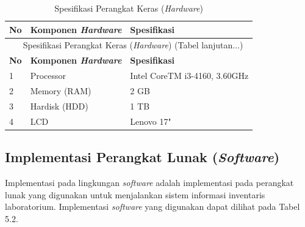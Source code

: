 	{
		\fontsize{10}{13}\selectfont
		\begin{longtable}{p{0.5cm} p{4.9cm} p{7.4cm}}
			\caption{Spesifikasi Perangkat Keras (\textit{Hardware})}                                                                                     \\
			\hline
			\textbf{No} & \textbf{Komponen \textit{Hardware}} & \textbf{Spesifikasi}                                                                      \\
			\hline
			\endfirsthead

			\multicolumn{3}{c}{\normalsize\tablename\ \textbf{\thetable}\ {{Spesifikasi Perangkat Keras (\textit{Hardware}) \space (Tabel lanjutan...)}}} \\
			\hline
			\textbf{No} & \textbf{Komponen \textit{Hardware}} & \textbf{Spesifikasi}                                                                      \\
			\hline
			\endhead

			\hline
			\endfoot

			1           & Processor                           & Intel \textregistered{} CoreTM i3-4160, 3.60GHz                                           \\
			2           & Memory (RAM)                        & 2 GB                                                                                      \\
			3           & Hardisk (HDD)                       & 1 TB                                                                                      \\
			4           & LCD                                 & Lenovo 17"                                                                                \\
			\hline
		\end{longtable}
	}

\subsection{Implementasi Perangkat Lunak (\textit{Software})}
Implementasi pada lingkungan \textit{software} adalah implementasi pada perangkat lunak yang digunakan untuk menjalankan sistem informasi inventaris laboratorium. Implementasi \textit{software} yang digunakan dapat dilihat pada Tabel 5.2.

